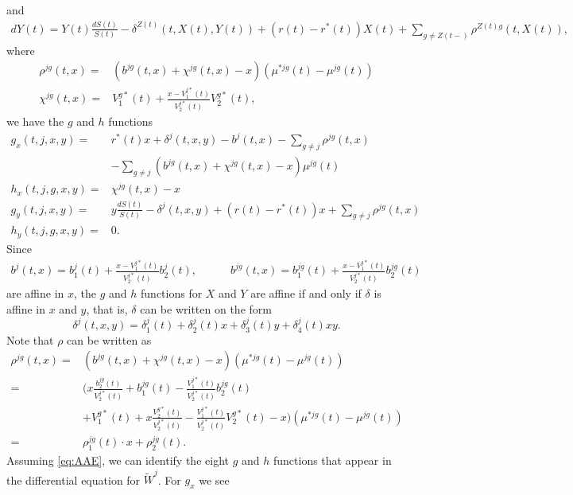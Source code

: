 \documentclass[12pt]{article}
\begin{document}
and
\begin{align*}
dY(t)=Y(t)\frac{dS(t)}{S(t)}-\delta^{Z(t)}(t,X(t),Y(t)) + (r(t)-r^*(t)) X(t) + \sum_{g \neq Z(t-)} \rho^{Z(t)g}(t,X(t)),
\end{align*}
where
\begin{align*}
\rho^{jg}(t,x)=&(b^{jg}(t,x)+ \chi^{jg}(t,x)-x) (\mu^{*jg}(t)-\mu^{jg}(t))
\\
\chi^{jg}(t,x)=& V^{g*}_1(t) + \frac{x-V^{j*}_1(t)}{V^{j*}_2(t)}V^{g*}_2(t),
\end{align*}
we have the $g$ and $h$ functions
\begin{align*}
g_x(t,j,x,y)=&r^*(t) x + \delta^j(t,x,y)-b^j(t,x)-\sum_{g \neq j} \rho^{jg}(t,x)
\\
&-\sum_{g \neq j} \left( b^{jg}(t,x)+\chi^{jg}(t,x)-x \right) \mu^{jg}(t)
\\
h_x(t,j,g,x,y)=& \chi^{jg}(t,x)-x
\\
g_y(t,j,x,y)=& y \frac{dS(t)}{S(t)} - \delta^j(t,x,y) + (r(t)-r^*(t)) x + \sum_{g \neq j} \rho^{jg}(t,x) 
\\
h_y(t,j,g,x,y)=& 0.
\end{align*}
Since
\begin{gather*}
b^j(t,x)=b_1^j(t)+\frac{x-V_1^{j*}(t)}{V_2^{j*}(t)}b^j_2(t),
\qquad \quad
b^{jg}(t,x)=b_1^{jg}(t)+\frac{x-V_1^{j*}(t)}{V_2^{j*}(t)}b^{jg}_2(t)
\end{gather*}
are affine in $x$, the $g$ and $h$ functions for $X$ and $Y$ are affine if and only if $\delta$ is affine in $x$ and $y$, that is, $\delta$ can be written on the form
\begin{equation}
\delta^j(t,x,y)=\delta_1^j(t)+\delta_2^j(t)x+\delta_3^j(t)y+\delta_4^j(t)xy. \label{eq:AAE}
\end{equation}
Note that $\rho$ can be written as
\begin{align*}
\rho^{jg}(t,x)=&
(b^{jg}(t,x)+ \chi^{jg}(t,x)-x) (\mu^{*jg}(t)-\mu^{jg}(t))
\\
=& 
\bigg( x \frac{b_2^{jg}(t)}{V_2^{j*}(t)} + b_1^{jg}(t) -  \frac{V_1^{j*}(t)}{V_2^{j*}(t)}b_2^{jg}(t)
\\
& + V^{g*}_1(t) + x\frac{V^{g*}_2(t)}{V^{j*}_2(t)}-\frac{V^{j*}_1(t)}{V^{j*}_2(t)}V^{g*}_2(t)-x \bigg) (\mu^{*jg}(t)-\mu^{jg}(t))
\\
=&
\rho_1^{jg}(t)\cdot x+\rho_2^{jg}(t).
\end{align*}
Assuming \eqref{eq:AAE}, we can identify the eight $g$ and $h$ functions that appear in the differential equation for $\tilde{W}^j$. For $g_x$ we see
\end{document}
